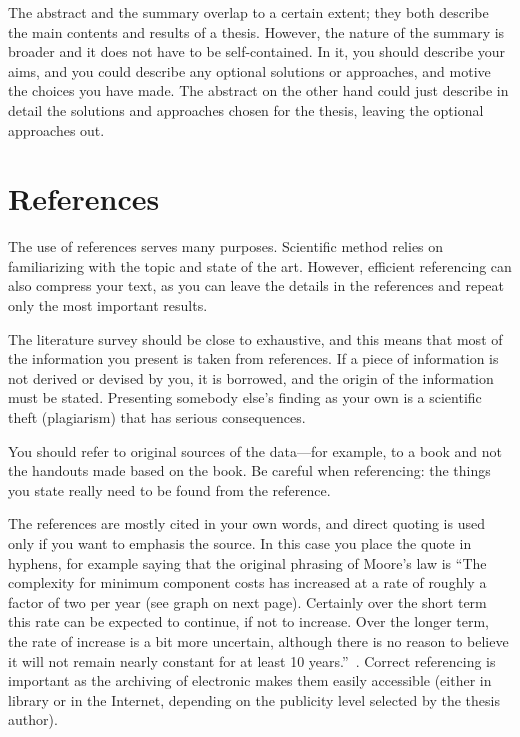 The abstract and the summary overlap to a certain extent; they both describe the main contents and results of a thesis. However, the nature of the summary is broader and it does not have to be self-contained. In it, you should describe your aims, and you could describe any optional solutions or approaches, and motive the choices you have made. The abstract on the other hand could just describe in detail the solutions and approaches chosen for the thesis, leaving the optional approaches out.

\section{References}

The use of references serves many purposes. Scientific method relies on familiarizing with the topic and state of the art. However, efficient referencing can also compress your text, as you can leave the details in the references and repeat only the most important results.

The literature survey should be close to exhaustive, and this means that most of the information you present is taken from references. If a piece of information is not derived or devised by you, it is borrowed, and the origin of the information must be stated. Presenting somebody else’s finding as your own is a scientific theft (plagiarism) that has serious consequences.

You should refer to original sources of the data---for example, to a book and not the handouts made based on the book. Be careful when referencing: the things you state really need to be found from the reference.

The references are mostly cited in your own words, and direct quoting is used only if you want to emphasis the source. In this case you place the quote in hyphens, for example saying that the original phrasing of Moore’s law is  “The complexity for minimum component costs has increased at a rate of roughly a factor of two per year (see graph on next page). Certainly over the short term this rate can be expected to continue, if not to increase. Over the longer term, the rate of increase is a bit more uncertain, although there is no reason to believe it will not remain nearly constant for at least 10 years.”~\cite{moore}.  Correct referencing is  important as the archiving of electronic makes them easily accessible (either in library or in the Internet, depending on the publicity level selected by the thesis author).

